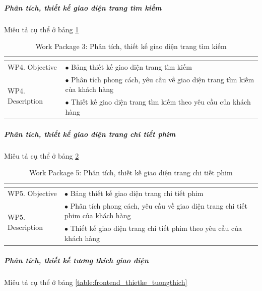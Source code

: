 \documentclass[a4paper]{book}
\begin{document}
\subparagraph{Phân tích, thiết kế giao diện trang tìm kiếm} Miêu tả cụ thể ở bảng \ref{table:frontend_thietke_trangtimkiem}
\begin{table}[h!]
	\begin{center}
		\begin{tabular}{|p{4cm}|p{10cm}|}
			\hline
			\multicolumn{2}{|c|}{\cellcolor[HTML]{363636}{\color[HTML]{FFFFFF}Work package 4: Phân tích, thiết kế giao diện trang tìm kiếm}}\\
			\hline
			\multirow{1}{*}{WP4. Objective} & $\bullet$ Bảng thiết kế giao diện trang tìm kiếm\\
			\hline
			\multirow{2}{*}{WP4. Description} & $\bullet$ Phân tích phong cách, yêu cầu về giao diện trang tìm kiếm của khách hàng \\
			& $\bullet$ Thiết kế giao diện trang tìm kiếm theo yêu cầu của khách hàng\\
			\hline
		\end{tabular}
		\caption{Work Package 3: Phân tích, thiết kế giao diện trang tìm kiếm}
		\label{table:frontend_thietke_trangtimkiem}
	\end{center}
\end{table}
\subparagraph{Phân tích, thiết kế giao diện trang chi tiết phim} Miêu tả cụ thể ở bảng \ref{table:frontend_thietke_trangchitietphim}
\begin{table}[h!]
	\begin{center}
		\begin{tabular}{|p{4cm}|p{10cm}|}
			\hline
			\multicolumn{2}{|c|}{\cellcolor[HTML]{363636}{\color[HTML]{FFFFFF}Work package 5: Phân tích, thiết kế giao diện trang chi tiết phim}}\\
			\hline
			\multirow{1}{*}{WP5. Objective} & $\bullet$ Bảng thiết kế giao diện trang chi tiết phim\\
			\hline
			\multirow{2}{*}{WP5. Description} & $\bullet$ Phân tích phong cách, yêu cầu về giao diện trang chi tiết phim của khách hàng \\
			& $\bullet$ Thiết kế giao diện trang chi tiết phim theo yêu cầu của khách hàng\\
			\hline
		\end{tabular}
		\caption{Work Package 5: Phân tích, thiết kế giao diện trang chi tiết phim}
		\label{table:frontend_thietke_trangchitietphim}
	\end{center}
\end{table}
\subparagraph{Phân tích, thiết kế tương thích giao diện} Miêu tả cụ thể ở bảng \ref{table:frontend_thietke_tuongthich}
\end{document}
